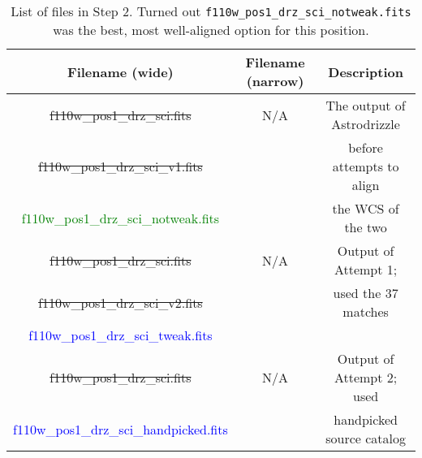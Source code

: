 \documentclass[11pt,obeyspaces]{article} %
\begin{document}
\begin{table}
\caption{List of files in Step 2. Turned out \texttt{f110w\_pos1\_drz\_sci\_notweak.fits} was the best, most well-aligned option for this position.}
\begin{tabular}{|c|c|c|} \hline
Filename (wide) & Filename (narrow) & Description \\ \hline \hline
\sout{f110w\_pos1\_drz\_sci.fits} & N/A & The output of Astrodrizzle  \\
\sout{f110w\_pos1\_drz\_sci\_v1.fits} &  & before attempts to align \\
\textcolor{Green}{f110w\_pos1\_drz\_sci\_notweak.fits} & & the WCS of the two \\ \hline
\sout{f110w\_pos1\_drz\_sci.fits} & N/A & Output of Attempt 1; \\
\sout{f110w\_pos1\_drz\_sci\_v2.fits} & & used the 37 matches  \\ 
\textcolor{blue}{f110w\_pos1\_drz\_sci\_tweak.fits}  & & \\ \hline
\sout{f110w\_pos1\_drz\_sci.fits} & N/A & Output of Attempt 2; used \\
\textcolor{blue}{f110w\_pos1\_drz\_sci\_handpicked.fits} &  & handpicked source catalog \\ \hline
\end{tabular}
\label{table:step2}
\end{table}
\end{document}
